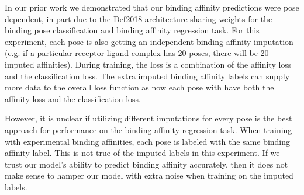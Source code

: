 \documentclass[journal=jmcmar,manuscript=article]{achemso}
\begin{document}
In our prior work we demonstrated that our binding affinity predictions were pose dependent, in part due to the Def2018 architecture sharing weights for the binding pose classification and binding affinity regression task\cite{crossdocked2020}.
For this experiment, each pose is also getting an independent binding affinity imputation (e.g. if a particular receptor-ligand complex has 20 poses, there will be 20 imputed affinities).
During training, the loss is a combination of the affinity loss and the classification loss.
The extra imputed binding affinity labels can supply more data to the overall loss function as now each pose with have both the affinity loss and the classification loss.

However, it is unclear if utilizing different imputations for every pose is the best approach for performance on the binding affinity regression task.
When training with experimental binding affinities, each pose is labeled with the same binding affinity label.
This is not true of the imputed labels in this experiment.
If we trust our model's ability to predict binding affinity accurately, then it does not make sense to hamper our model with extra noise when training on the imputed labels.
\end{document}

